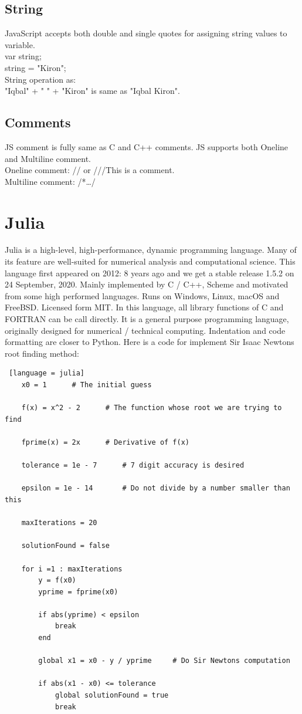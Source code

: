 \documentclass[10 pt]{book}
\begin{document}
\section{String}
JavaScript accepts both double and single quotes for assigning string values to variable.\\
var string;\\
string = "Kiron";\\
String operation as:\\
"Iqbal" + " " + "Kiron" is same as "Iqbal Kiron".
\section{Comments}
JS comment is fully same as C and C++ comments. JS supports both Oneline and Multiline comment.\\
Oneline comment: // or ///This is a comment.\\
Multiline comment: /*\dots*/

\chapter{Julia}
Julia is a high-level, high-performance, dynamic programming language. Many of its feature are well-suited for numerical analysis and computational science. This language first appeared on 2012: 8 years ago and we get a stable release 1.5.2 on 24 September, 2020. Mainly implemented by C / C++, Scheme and motivated from some high performed languages. Runs on Windows, Linux, macOS and FreeBSD. Licensed form MIT. In this language, all library functions of C and FORTRAN can be call directly. It is a general purpose programming language, originally designed for numerical / technical computing. Indentation and code formatting are closer to Python. Here is a code for implement Sir Isaac Newtons root finding method:
\begin{lstlisting} [language = julia]
	x0 = 1		# The initial guess
	
	f(x) = x^2 - 2		# The function whose root we are trying to find
	
	fprime(x) = 2x		# Derivative of f(x)
	
	tolerance = 1e - 7		# 7 digit accuracy is desired
	
	epsilon = 1e - 14		# Do not divide by a number smaller than this
	
	maxIterations = 20
	
	solutionFound = false
	
	for i =1 : maxIterations
		y = f(x0)
		yprime = fprime(x0)
		
		if abs(yprime) < epsilon
			break
		end
		
		global x1 = x0 - y / yprime		# Do Sir Newtons computation
		
		if abs(x1 - x0) <= tolerance
			global solutionFound = true
			break
\end{lstlisting}
\end{document}
